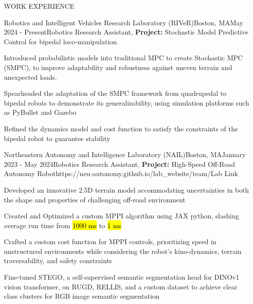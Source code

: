 \documentclass{resume} %
\begin{document}
\begin{rSection}{WORK EXPERIENCE}
	\begin{rProjExpDetails}{Robotics and Intelligent Vehicles Research Laboratory (RIVeR)}{Boston, MA}{May 2024 - Present}{Robotics Research Assistant, \textbf{Project:} Stochastic Model Predictive Control for bipedal loco-manipulation}{}{}
		\item Introduced probabilistic models into traditional MPC to create Stochastic MPC (SMPC), to improve adaptability and robustness against uneven terrain and unexpected loads.
		\item Spearheaded the adaptation of the SMPC framework from quadrupedal to bipedal robots to demonstrate its generalizability, using simulation platforms such as PyBullet and Gazebo
		\item Refined the dynamics model and cost function to satisfy the constraints of the bipedal robot to guarantee stability %
	\end{rProjExpDetails}
	\begin{rProjExpDetails}{Northeastern Autonomy and Intelligence Laboratory (NAIL)}{Boston, MA}{January 2023 - May 2024}{Robotics Research Assistant, \textbf{Project:} High-Speed Off-Road Autonomy Robot}{https://neu-autonomy.github.io/lab_website/team/}{Lab Link}
		\item Developed an innovative 2.5D terrain model accommodating uncertainties in both the shape and properties of challenging off-road environment
		\item Created and Optimized a custom MPPI algorithm using JAX python, slashing average run time from \hl{1000 ms} to \hl{1 ms}
		\item Crafted a custom cost function for MPPI controls, prioritizing speed in unstructured environments while considering the robot's kino-dynamics, terrain traversability, and safety constraints
		\item Fine-tuned STEGO, a self-supervised semantic segmentation head for DINOv1 vision transformer, on RUGD, RELLIS, and a custom dataset to achieve clear class clusters for RGB image semantic segmentation

\end{rProjExpDetails}
\end{rSection}
\end{document}
